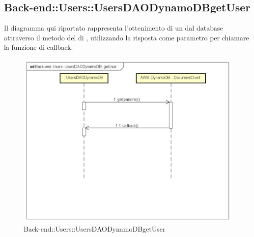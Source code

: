 \subsection{Back-end::Users::UsersDAODynamoDBgetUser}
Il diagramma qui riportato rappresenta l'ottenimento di un  dal database attraverso il metodo  del  di , utilizzando la risposta come parametro per chiamare la funzione di callback.
\begin{figure}[h] \centering \includegraphics[width=\textwidth,height=\textheight,keepaspectratio]{images/diagrams/back-end/Ufficial_Backend/Back-endUsersUsersDAODynamoDBgetUser.png} 	\caption{Back-end::Users::UsersDAODynamoDBgetUser}
\end{figure}
\newpage
